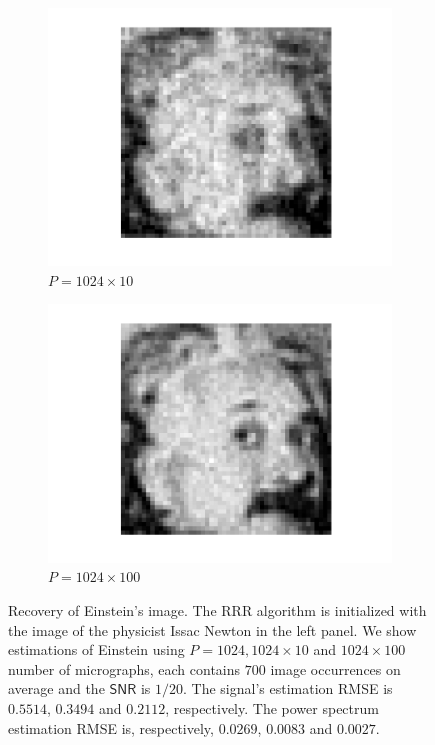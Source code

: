 \documentclass[english,11pt]{article}
\newcommand{\1}{\mathbf{1}}
\newcommand{\TODO}[1]{{\color{red}{[#1]}}}
\numberwithin{equation}{section}
\theoremstyle{plain}
\theoremstyle{definition}
\theoremstyle{remark}
\theoremstyle{plain}
\theoremstyle{remark}
\theoremstyle{plain}
\theoremstyle{plain}
\newcommand{\SNR}{\ensuremath{\textsf{SNR}}}
\begin{document}
\begin{figure}[h!]
\begin{subfigure}[h]{0.25\textwidth}
		\includegraphics[scale=0.3]{reconstruction20}
		\caption{$P = 1024\times 10$}
	\end{subfigure}%
	\begin{subfigure}[h]{0.25\textwidth}
		\centering
		\includegraphics[scale=0.3]{reconstruction200}
		\caption{$P = 1024\times 100$}
	\end{subfigure}%
	\caption{\label{fig:Einst_example} \TODO{Caption and image not yet revised} Recovery of Einstein's image. The RRR algorithm is initialized with the image of the physicist Issac Newton in the left panel. We show estimations of Einstein using $P=1024,1024\times 10$ and $1024\times 100$ number of micrographs, each contains $700$ image occurrences on average and the $\SNR$ is $1/20$. The signal's estimation RMSE is $0.5514$, $0.3494$ and $0.2112$, respectively. The power spectrum estimation RMSE is, respectively, $0.0269 $, $0.0083$ and $0.0027$. \TODO{Can add more images to exemplify the progress}\TODO{Resolution of Newton too high?}}	
\end{figure}
\end{document}
